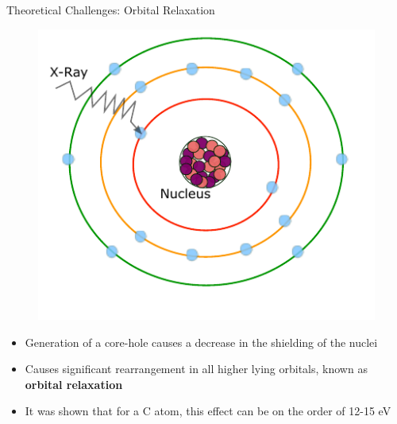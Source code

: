 \documentclass[t]{beamer}
\begin{document}
\begin{frame}{Theoretical Challenges: Orbital Relaxation}
\begin{figure}[!t]
\includegraphics[scale=0.7]{core_hole_generation_2.pdf}
\end{figure}
\begin{itemize}
\item Generation of a core-hole causes a decrease in the shielding of the nuclei 
\item Causes significant rearrangement in all higher lying orbitals, known as \textbf{orbital relaxation}
\item It was shown that for a C atom, this effect can be on the order of 12-15 eV
\end{itemize}
\end{frame}
\end{document}
